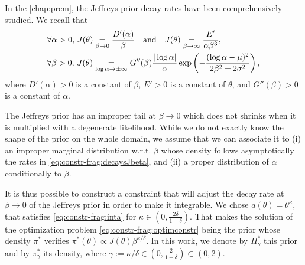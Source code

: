 In the \cref{chap:prem}, the Jeffreys prior decay rates have been comprehensively studied.
We recall that
    \begin{align}\label{eq:constr-frag:decaysJbeta}
        &\forall\alpha>0,\, J(\theta) \overset{}{\underset{\beta\rightarrow0}{=}}\frac{D'(\alpha)}{\beta}\quad\text{and}\quad J(\theta)\overset{}{\underset{\beta\rightarrow\infty}{=}}\frac{E'}{\alpha\beta^3}, \\
        &\forall\beta>0,\,J(\theta) \overset{}{\underset{\log\alpha\rightarrow\pm\infty}{=}}G''(\beta)\frac{|\log\alpha|}{\alpha}\exp\left(-\frac{(\log\alpha-\mu)^2}{2\beta^2+2\sigma^2}\right),\label{eq:constr-frag:decaysJalpha}
    \end{align}
where $D'(\alpha)>0$ is a constant of $\beta$, $E'>0$ is a constant of $\theta$, and $G''(\beta)>0$ is a constant of $\alpha$.

The Jeffreys prior has an improper tail at $\beta\to0$ which does not shrinks when it is multiplied with a degenerate likelihood.
While we do not exactly know the shape of the prior on the whole domain, we assume that we can associate it to (i) an improper marginal distribution w.r.t. $\beta$ whose density follows asymptotically the rates in \cref{eq:constr-frag:decaysJbeta}, and (ii) a proper distribution of $\alpha$ conditionally to $\beta$.



It is thus possible to construct a constraint that will adjust the decay rate at $\beta\to0$ of the Jeffreys prior in order to make it integrable.
We chose $a(\theta)=\theta^\kappa$, that satisfies \cref{eq:constr-frag:inta} for $\kappa\in(0,\frac{2\delta}{1+\delta})$. That makes the solution of the optimization problem \cref{eq:constr-frag:optimconstr} being the prior whose density $\pi^\ast$ verifies $\pi^\ast(\theta)\propto J(\theta)\beta^{\kappa/\delta}$. In this work, we denote by $\varPi^\ast_\gamma$ this prior and by $\pi^\ast_\gamma$ its density, where $\gamma:=\kappa/\delta\in(0,\frac{2}{1+\delta})\subset(0,2)$.













